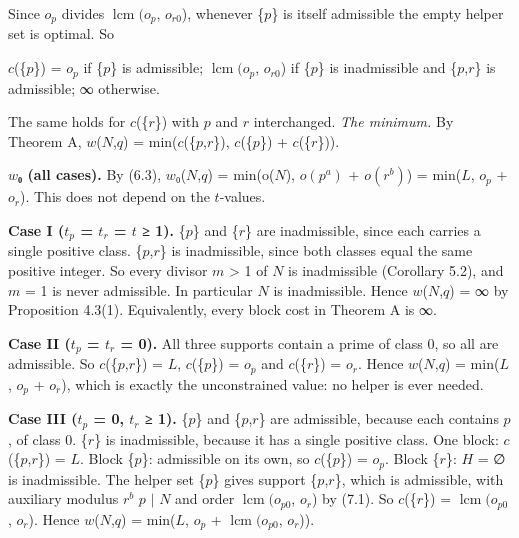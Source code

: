 \documentclass[pdflatex,sn-mathphys-num]{sn-jnl}
\theoremstyle{thmstyleone}
\theoremstyle{thmstylethree}
\begin{document}
\begin{center}Since \(o_p\) divides \(\operatorname{lcm}(o_p\), \(o_{r0}\)), whenever \{\(p\)\} is itself admissible the empty helper set is optimal. So\end{center}

\begin{center}\(c\)(\{\(p\)\}) = \(o_p\) if \{\(p\)\} is admissible; \(\operatorname{lcm}(o_p\), \(o_{r0}\)) if \{\(p\)\} is inadmissible and \{\(p\),\(r\)\} is admissible; ∞ otherwise.\end{center}

The same holds for \(c\)(\{\(r\)\}) with \(p\) and \(r\) interchanged.
\emph{The minimum.} By Theorem A, \(w\)(\(N\),\(q\)) = min(\(c\)(\{\(p\),\(r\)\}), \(c\)(\{\(p\)\}) + \(c\)(\{\(r\)\})).

\textbf{\(w\)₀ (all cases).} By (6.3), \(w\)₀(\(N\),\(q\)) = min(o(\(N\)), \(o(p^a)\) + \(o(r^b)\)) = min(\(L\), \(o_p\) + \(o_r\)). This does not depend on the \(t\)-values.

\textbf{Case I (\(t_p\) = \(t_r\) = \(t\) ≥ 1).} \{\(p\)\} and \{\(r\)\} are inadmissible, since each carries a single positive class. \{\(p\),\(r\)\} is inadmissible, since both classes equal the same positive integer. So every divisor \(m\) \textgreater{} 1 of \(N\) is inadmissible (Corollary 5.2), and \(m\) = 1 is never admissible. In particular \(N\) is inadmissible. Hence \(w\)(\(N\),\(q\)) = ∞ by Proposition 4.3(1). Equivalently, every block cost in Theorem A is ∞.

\textbf{Case II (\(t_p\) = \(t_r\) = 0).} All three supports contain a prime of class 0, so all are admissible. So \(c\)(\{\(p\),\(r\)\}) = \(L\), \(c\)(\{\(p\)\}) = \(o_p\) and \(c\)(\{\(r\)\}) = \(o_r\). Hence \(w\)(\(N\),\(q\)) = min(\(L\), \(o_p\) + \(o_r\)), which is exactly the unconstrained value: no helper is ever needed.

\textbf{Case III (\(t_p\) = 0, \(t_r\) ≥ 1).} \{\(p\)\} and \{\(p\),\(r\)\} are admissible, because each contains \(p\), of class 0. \{\(r\)\} is inadmissible, because it has a single positive class. One block: \(c\)(\{\(p\),\(r\)\}) = \(L\). Block \{\(p\)\}: admissible on its own, so \(c\)(\{\(p\)\}) = \(o_p\). Block \{\(r\)\}: \(H\) = ∅ is inadmissible. The helper set \{\(p\)\} gives support \{\(p\),\(r\)\}, which is admissible, with auxiliary modulus \(r^b\) \(p\) \(\mid\) \(N\) and order \(\operatorname{lcm}(o_{p0}\), \(o_r\)) by (7.1). So \(c\)(\{\(r\)\}) = \(\operatorname{lcm}(o_{p0}\), \(o_r\)). Hence \(w\)(\(N\),\(q\)) = min(\(L\), \(o_p\) + \(\operatorname{lcm}(o_{p0}\), \(o_r\))).
\end{document}
